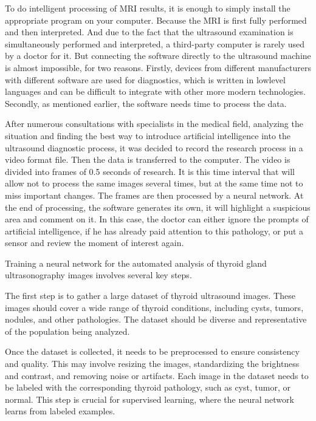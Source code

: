 \documentclass{article}
\begin{document}
\par To do intelligent processing of MRI results, it is
enough to simply install the appropriate program on your
computer. Because the MRI is first fully performed and
then interpreted. And due to the fact that the ultrasound
examination is simultaneously performed and interpreted,
a third-party computer is rarely used by a doctor for it.
But connecting the software directly to the ultrasound
machine is almost impossible, for two reasons. Firstly,
devices from different manufacturers with different software are used for diagnostics, which is written in lowlevel languages and can be difficult to integrate with
other more modern technologies. Secondly, as mentioned
earlier, the software needs time to process the data.

\newpage

\par After numerous consultations with specialists in the
medical field, analyzing the situation and finding the best
way to introduce artificial intelligence into the ultrasound
diagnostic process, it was decided to record the research
process in a video format file. Then the data is transferred
to the computer. The video is divided into frames of
0.5 seconds of research. It is this time interval that will
allow not to process the same images several times, but
at the same time not to miss important changes. The
frames are then processed by a neural network. At the
end of processing, the software generates its own, it
will highlight a suspicious area and comment on it. In
this case, the doctor can either ignore the prompts of
artificial intelligence, if he has already paid attention to
this pathology, or put a sensor and review the moment
of interest again.

\par Training a neural network for the automated analysis
of thyroid gland ultrasonography images involves several
key steps.

\par The first step is to gather a large dataset of thyroid ultrasound images. These images should cover a wide range
of thyroid conditions, including cysts, tumors, nodules,
and other pathologies. The dataset should be diverse and
representative of the population being analyzed.

\par Once the dataset is collected, it needs to be preprocessed to ensure consistency and quality. This may
involve resizing the images, standardizing the brightness
and contrast, and removing noise or artifacts. Each image
in the dataset needs to be labeled with the corresponding
thyroid pathology, such as cyst, tumor, or normal. This
step is crucial for supervised learning, where the neural
network learns from labeled examples.
\end{document}
